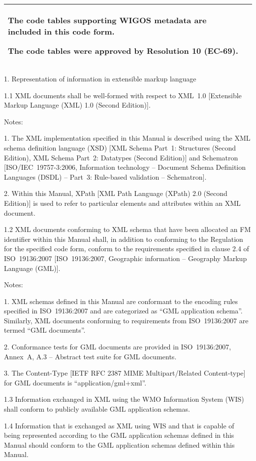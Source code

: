 \begin{longtable}[]{@{}ll@{}}
\begin{minipage}[t]{0.47\columnwidth}
The code tables supporting WIGOS metadata are included in this code form.

The code tables were approved by Resolution 10 (EC-69).\strut
\end{minipage}\tabularnewline
\bottomrule
\end{longtable}

1. Representation of information in extensible markup language

1.1 XML documents shall be well-formed with respect to XML~1.0 {[}Extensible Markup Language (XML) 1.0 (Second Edition){]}.

Notes:

1. The XML implementation specified in this Manual is described using the XML schema definition language (XSD) {[}XML Schema Part~1: Structures (Second Edition), XML Schema Part~2: Datatypes (Second Edition){]} and Schematron {[}ISO/IEC~19757-3:2006, Information technology -- Document Schema Definition Languages (DSDL) -- Part~3: Rule-based validation -- Schematron{]}.

2. Within this Manual, XPath {[}XML Path Language (XPath) 2.0 (Second Edition){]} is used to refer to particular elements and attributes within an XML document.

1.2 XML documents conforming to XML schema that have been allocated an FM identifier within this Manual shall, in addition to conforming to the Regulation for the specified code form, conform to the requirements specified in clause 2.4 of ISO~19136:2007 {[}ISO~19136:2007, Geographic information -- Geography Markup Language (GML){]}.

Notes:

1. XML schemas defined in this Manual are conformant to the encoding rules specified in ISO~19136:2007 and are categorized as ``GML application schema''. Similarly, XML documents conforming to requirements from ISO~19136:2007 are termed ``GML documents''.

2. Conformance tests for GML documents are provided in ISO~19136:2007, Annex~A, A.3 -- Abstract test suite for GML documents.

3. The Content-Type {[}IETF RFC 2387 MIME Multipart/Related Content-type{]} for GML documents is ``application/gml+xml''.

1.3 Information exchanged in XML using the WMO Information System (WIS) shall conform to publicly available GML application schemas.

1.4 Information that is exchanged as XML using WIS and that is capable of being represented according to the GML application schemas defined in this Manual should conform to the GML application schemas defined within this Manual.

